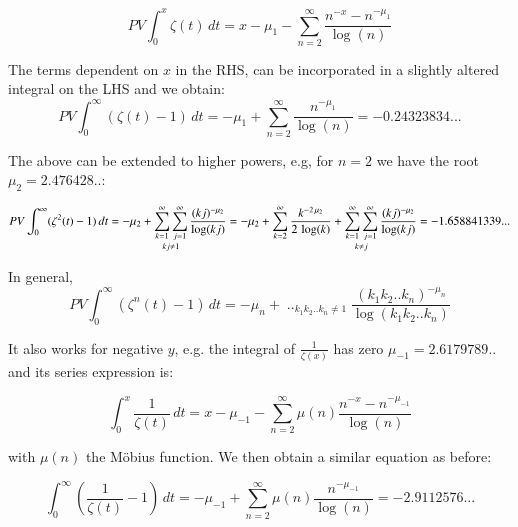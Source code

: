 \documentclass[a4paper,11pt,twoside]{amsart}
\begin{document}
\begin{equation}\label{zetPV2}
  PV \int_0^x \zeta(t)\, dt = x - \mu_1 - \sum_{n=2}^{\infty} \frac{n^{-x}-n^{-\mu_1}}{\log(n)}
\end{equation}

The terms dependent on $x$ in the RHS, can be incorporated in a slightly altered integral on the LHS and we obtain:
\begin{equation}\label{zetPV3}
  PV \int_0^{\infty} (\zeta(t) - 1) \,dt = -\mu_1+\sum_{n=2}^{\infty} \frac{n^{-\mu_1}}{\log(n)}=-0.24323834...
\end{equation}

The above can be extended to higher powers, e.g, for $n=2$ we have the root $\mu_{2} = 2.476428..$:

\begin{equation}\label{zetPV4}
 PV \int_0^{\infty} (\zeta^{2}(t) - 1) \,dt = -\mu_{2} + \mathop{\sum_{k=1}^{\infty}\sum_{j=1}^{\infty}}_{kj \ne 1} \frac{(kj)^{-\mu_{2}}}{\log(kj)}\\
= -\mu_{2}+\sum_{k=2}^{\infty} \frac{k^{-2\,\mu_{2}}}{2\,\log(k)} + \mathop{\sum_{k=1}^{\infty}\sum_{j=1}^{\infty}}_{k \ne j} \frac{(kj)^{-\mu_{2}}}{\log(kj)} = -1.658841339... 
\end{equation}

In general, 
\begin{equation}\label{zetPV5}
 PV \int_0^{\infty} (\zeta^{n}(t) - 1) \,dt = -\mu_{n} + \mathop{\sum_{k_{1}=1}^{\infty}\sum_{k_{2}=1}^{\infty}..\sum_{k_{n}=1}^{\infty}}_{k_{1}k_{2}..k_{n} \ne 1} \frac{(k_{1}k_{2}..k_{n})^{-\mu_{n}}}{\log(k_{1}k_{2}..k_{n})}
\end{equation}

It also works for negative $y$, e.g. the integral of $\frac{1}{\zeta(x)}$ has zero $\mu_{-1} = 2.6179789..$ and its series expression is:

\begin{equation}\label{zetPV6}
 \int_0^x \frac{1}{\zeta(t)}\, dt = x- \mu_{-1} - \sum_{n=2}^{\infty} \mu(n)\frac{n^{-x}-n^{-\mu_{-1}}}{\log(n)}
\end{equation}

with $\mu(n)$ the Möbius function. We then obtain a similar equation as before:

\begin{equation}\label{zetPV7}
  \int_0^{\infty} \left(\frac{1}{\zeta(t)} -1\right) \,dt = -\mu_{-1}+\sum_{n=2}^{\infty} \mu(n)\frac{n^{-\mu_{-1}}}{\log(n)} = -2.9112576...
\end{equation}
\end{document}
